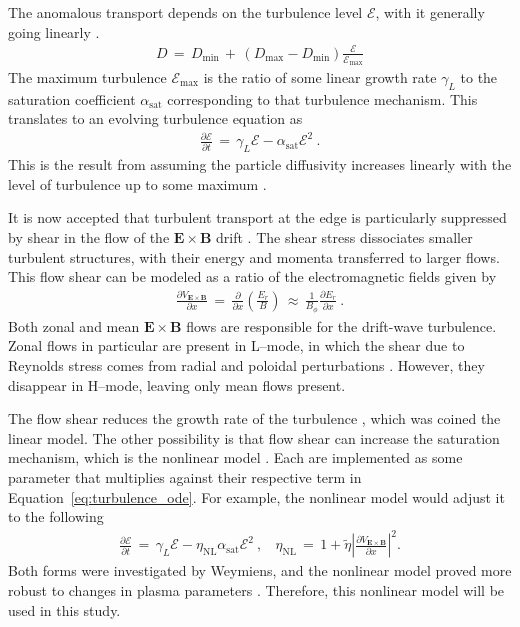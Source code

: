 The anomalous transport depends on the turbulence level $\mathcal{E}$, with it generally going linearly \cite{hahm_rotation_1994}.
\begin{align} %
	D \,=\, D_\text{min} \,+\, (D_\text{max} - D_\text{min})
		\frac{\mathcal{E}}{\mathcal{E}_\text{max}}
	\label{eq:diffusivity_turbulence}
\end{align}
The maximum turbulence $\mathcal{E}_\text{max}$ is the ratio of some linear growth rate $\gamma_L$ to the saturation coefficient $\alpha_\text{sat}$ corresponding to that turbulence mechanism.
This translates to an evolving turbulence equation as
\begin{align} %
	\frac{\partial\mathcal{E}}{\partial t} \,=\, \gamma_L\mathcal{E} - \alpha_\text{sat}\mathcal{E}^2~.
	\label{eq:turbulence_ode}
\end{align}
This is the result from assuming the particle diffusivity increases linearly with the level of turbulence up to some maximum \cite{diamond_dynamics_1995}.

It is now accepted that turbulent transport at the edge is particularly suppressed by shear in the flow of the $\mathbf{E}\times\mathbf{B}$ drift \cite{terry_suppression_2000}.
The shear stress dissociates smaller turbulent structures, with their energy and momenta transferred to larger flows.
This flow shear can be modeled as a ratio of the electromagnetic fields given by \cite{staps_backstepping_2017}
\begin{align} %
	\frac{\partial V_{\mathbf{E}\times\mathbf{B}}}{\partial x} \,=\,
		\frac{\partial}{\partial x} \left(\frac{E_r}{B}\right) \,\approx\,
		\frac{1}{B_\phi} \frac{\partial E_r}{\partial x}~.
	\label{eq:velocity_shear}
\end{align}
Both zonal and mean $\mathbf{E}\times\mathbf{B}$ flows are responsible for the drift-wave turbulence.
Zonal flows in particular are present in L--mode, in which the shear due to Reynolds stress comes from radial and poloidal perturbations \cite{diamond_zonal_2005}.
However, they disappear in H--mode, leaving only mean flows present.

The flow shear reduces the growth rate of the turbulence \cite{diamond_self-regulating_1994}, which was coined the linear model.
The other possibility is that flow shear can increase the saturation mechanism, which is the nonlinear model \cite{hahm_rotation_1994}.
Each are implemented as some parameter that multiplies against their respective term in Equation~\ref{eq:turbulence_ode}.
For example, the nonlinear model would adjust it to the following
\begin{align} %
	\frac{\partial\mathcal{E}}{\partial t} \,=\, \gamma_L\mathcal{E} -
		\eta_\text{NL}\alpha_\text{sat}\mathcal{E}^2~, ~~~~ \eta_\text{NL} \,=\,
		1 + \tilde{\eta} \left|\frac{\partial V_{\mathbf{E}\times\mathbf{B}}}{\partial x}\right|^2.
	\label{eq:nonlinear_turbulence_ode}
\end{align}
Both forms were investigated by Weymiens, and the nonlinear model proved more robust to changes in plasma parameters \cite{weymiens_bifurcation_2014}.
Therefore, this nonlinear model will be used in this study.

